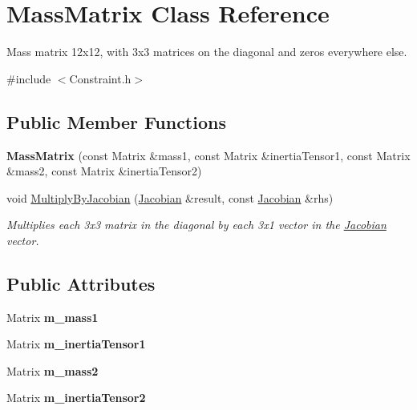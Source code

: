 \hypertarget{classMassMatrix}{}\section{Mass\+Matrix Class Reference}
\label{classMassMatrix}


Mass matrix 12x12, with 3x3 matrices on the diagonal and zeros everywhere else.  




{\ttfamily \#include $<$Constraint.\+h$>$}

\subsection*{Public Member Functions}
\begin{DoxyCompactItemize}
\item 
\mbox{\label{classMassMatrix_aa4c5b355fc163d71b4b776c0e3043d2e}} 
{\bfseries Mass\+Matrix} (const Matrix \&mass1, const Matrix \&inertia\+Tensor1, const Matrix \&mass2, const Matrix \&inertia\+Tensor2)
\item 
void \hyperlink{classMassMatrix_a2e5a4cd3710baa07395e07b03c2cd49c}{Multiply\+By\+Jacobian} (\hyperlink{classJacobian}{Jacobian} \&result, const \hyperlink{classJacobian}{Jacobian} \&rhs)
\begin{DoxyCompactList}\small\item\em Multiplies each 3x3 matrix in the diagonal by each 3x1 vector in the \hyperlink{classJacobian}{Jacobian} vector. \end{DoxyCompactList}\end{DoxyCompactItemize}
\subsection*{Public Attributes}
\begin{DoxyCompactItemize}
\item 
\mbox{\label{classMassMatrix_a2c37f7ad4cc7553509916fc610218cc5}} 
Matrix {\bfseries m\+\_\+mass1}
\item 
\mbox{\label{classMassMatrix_af2baea4cdb4613fe0a6c5b20adf3eadd}} 
Matrix {\bfseries m\+\_\+inertia\+Tensor1}
\item 
\mbox{\label{classMassMatrix_a58913e2b6b14fe9b50d34ee73f03518b}} 
Matrix {\bfseries m\+\_\+mass2}
\item 
\mbox{\label{classMassMatrix_a1decec128b8df0fafcc0a2948e653085}} 
Matrix {\bfseries m\+\_\+inertia\+Tensor2}
\end{DoxyCompactItemize}


